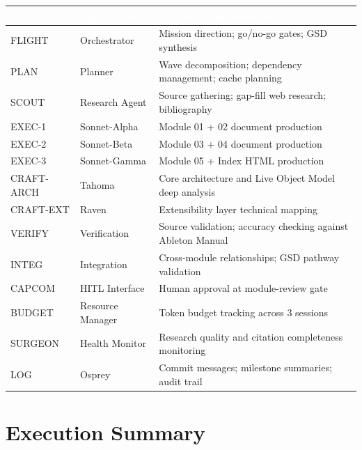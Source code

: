 \documentclass[11pt,letterpaper]{article}
\newcommand{\tableheader}[1]{\textbf{\sffamily\textcolor{white}{#1}}}
\begin{document}
\begin{center}
\begin{tabularx}{\textwidth}{L{2cm}L{3cm}X}
\toprule
{}
\tableheader{Role} & \tableheader{Agent Name} & \tableheader{Primary Responsibility} \\
\midrule
FLIGHT & Orchestrator & Mission direction; go/no-go gates; GSD synthesis \\
PLAN & Planner & Wave decomposition; dependency management; cache planning \\
SCOUT & Research Agent & Source gathering; gap-fill web research; bibliography \\
EXEC-1 & Sonnet-Alpha & Module 01 + 02 document production \\
EXEC-2 & Sonnet-Beta & Module 03 + 04 document production \\
EXEC-3 & Sonnet-Gamma & Module 05 + Index HTML production \\
CRAFT-ARCH & Tahoma & Core architecture and Live Object Model deep analysis \\
CRAFT-EXT & Raven & Extensibility layer technical mapping \\
VERIFY & Verification & Source validation; accuracy checking against Ableton Manual \\
INTEG & Integration & Cross-module relationships; GSD pathway validation \\
CAPCOM & HITL Interface & Human approval at module-review gate \\
BUDGET & Resource Manager & Token budget tracking across 3 sessions \\
SURGEON & Health Monitor & Research quality and citation completeness monitoring \\
LOG & Osprey & Commit messages; milestone summaries; audit trail \\
\bottomrule
\end{tabularx}
\end{center}

\section{Execution Summary}
\end{document}
